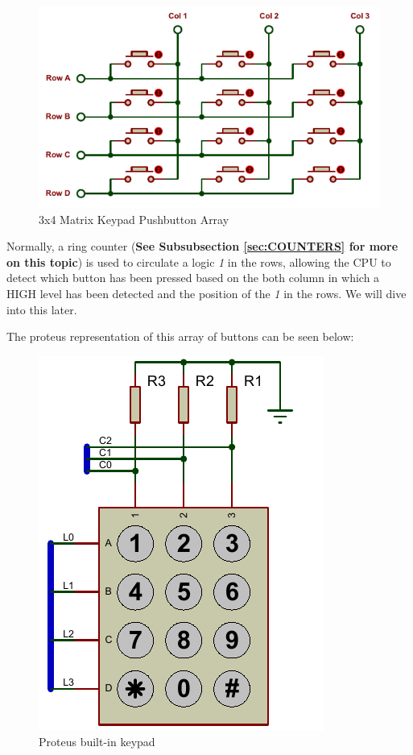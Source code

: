 \begin{figure}[H]
    \centering
    \includegraphics[scale = 1]{Graphics/VHDL/Practice 5/KEYPAD/KEYPAD_BUTTONS.PDF}
    \caption{3x4 Matrix Keypad Pushbutton Array}
    \label{fig:KEYPAD_BUTTON}
\end{figure}

Normally, a ring counter (\textbf{See Subsubsection \ref{sec:COUNTERS} for more on this topic}) is used to circulate a logic \textit{1} in the rows, allowing the CPU to detect which button has been pressed based on the both column in which a HIGH level has been detected and the position of the \textit{1} in the rows. We will dive into this later.\medskip

The proteus representation of this array of buttons can be seen below:\medskip


\begin{figure}[H]
    \centering
    \includegraphics[scale = 0.85]{Graphics/VHDL/Practice 5/KEYPAD/KEYPAD.PDF}
    \caption{Proteus built-in keypad}
    \label{fig:PROTEUS_KEYPAD}
\end{figure}

